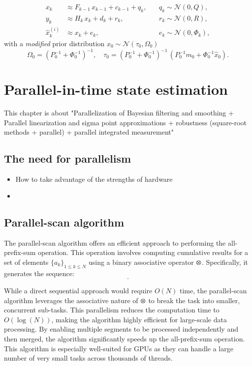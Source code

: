 \documentclass[dissertation,math,vertlayout,pdfa,colorlinks,nologo]{aaltoseries}
\DeclareMathOperator*{\Motimes}{\text{\raisebox{0.25ex}{\scalebox{0.65}{$\bigotimes$}}}}
\begin{document}
\begin{align*}
    x_{k} & \approx F_{k-1} \, x_{k-1} + c_{k-1} + q_{k},&&  \, q_{k} \sim \mathcal{N}(0, Q), \\
    y_{k} & \approx H_{k} \, x_{k} + d_{k} + r_{k},&&  \, r_{k} \sim \mathcal{N}(0, R), \\
    \hat{x}_{k}^{(i)} & \approx x_{k} + e_{k},&& \, e_{k} \sim \mathcal{N}(0, \Phi_{k}),
\end{align*}
with a \emph{modified} prior distribution $x_{0} \sim \mathcal{N}(\tau_{0}, \Omega_{0})$
\begin{equation}
    \Omega_{0} = (P^{-1}_{0} + \Phi^{-1}_{0})^{-1}, \quad \tau_{0} = (P^{-1}_{0} + \Phi^{-1}_{0})^{-1} \, (P^{-1}_{0} m_0 + \Phi^{-1}_{0} \hat{x}_0).
\end{equation}
%
\chapter{Parallel-in-time state estimation}
\label{ch:parallel-fs}
This chapter is about "Parallelization of Bayesian filtering and smoothing + Parallel linearization and sigma point approximations + robustness (square-root methods + parallel) + parallel integrated measurement"

\section{The need for parallelism}
\citep{plancher2022gpu}
\begin{itemize}
    \item How to take advantage of the strengths of hardware
    \item 
\end{itemize}
\section{Parallel-scan algorithm} \label{sec:parallel-scan}
    The parallel-scan algorithm \citep{blelloch1989scans} offers an efficient approach to performing the all-prefix-sum operation. This operation involves computing cumulative results for a set of elements $\{a_k\}_{1 \leq k \leq N}$ using a binary associative operator $\Motimes$. Specifically, it generates the sequence:
    \begin{equation}
        [(a_1), \, (a_1 \Motimes a_2), \,\ldots, \, (a_1 \Motimes a_2 \Motimes \ldots \Motimes a_n)].
    \end{equation}
    
    While a direct sequential approach would require $O(N)$ time, the parallel-scan algorithm leverages the associative nature of $\Motimes$ to break the task into smaller, concurrent sub-tasks. This parallelism reduces the computation time to $O(\log(N))$, making the algorithm highly efficient for large-scale data processing. By enabling multiple segments to be processed independently and then merged, the algorithm significantly speeds up the all-prefix-sum operation. This algorithm is especially well-suited for GPUs as they can handle a large number of very small tasks across thousands of threads. 
\end{document}

